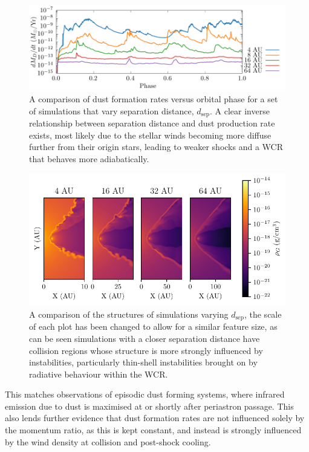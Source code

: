 \documentclass[fleqn,usenatbib]{mnras}
\begin{document}
\begin{figure}
  \centering
  \includegraphics[width=\linewidth]{assets/dsep-results/dsep-phase-dust_rate.pdf}
  \caption[Dust formation rate versus binary separation distance]{A comparison of dust formation rates versus orbital phase for a set of simulations that vary separation distance, $d_\text{sep}$. A clear inverse relationship between separation distance and dust production rate exists, most likely due to the stellar winds becoming more diffuse further from their origin stars, leading to weaker shocks and a WCR that behaves more adiabatically.}
  \label{fig:dsepdustproduction}
\end{figure}

\begin{figure}
  \centering
  \includegraphics[width=\linewidth]{assets/adiabatic-flow/instab-comp-rho.pdf}
  \caption[A comparison of the structures of simulations varying $d_\text{sep}$]{A comparison of the structures of simulations varying $d_\text{sep}$, the scale of each plot has been changed to allow for a similar feature size, as can be seen simulations with a closer separation distance have collision regions whose structure is more strongly influenced by instabilities, particularly thin-shell instabilities brought on by radiative behaviour within the WCR.}
  \label{fig:dsepinstabilities}
\end{figure}

This matches observations of episodic dust forming systems, where infrared emission due to dust is maximised at or shortly after periastron passage. This also lends further evidence that dust formation rates are not influenced solely by the momentum ratio, as this is kept constant, and instead is strongly influenced by the wind density at collision and post-shock cooling. 
\end{document}
